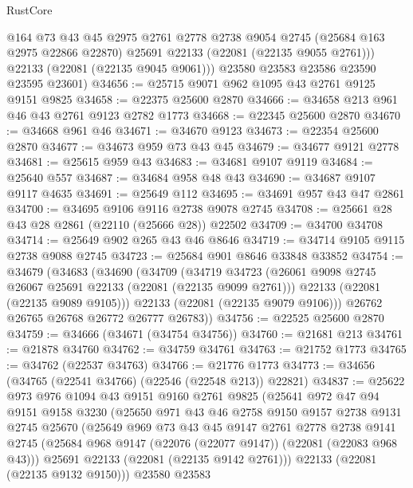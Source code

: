 \begin{lexlean}{RustCore}
\begin{coremodule}
          @164
          @73
          @43
          @45
          @2975
          @2761
          @2778
          @2738
          @9054
          @2745
          (@25684 @163 @2975 @22866 @22870)
          @25691
          @22133
          (@22081 (@22135 @9055 @2761)))
        @22133
        (@22081 (@22135 @9045 @9061)))
      @23580
      @23583
      @23586
      @23590
      @23595
      @23601)
@34656 := @25715 @9071 @962 @1095 @43 @2761 @9125 @9151 @9825
@34658 := @22375 @25600 @2870
@34666 := @34658 @213 @961 @46 @43 @2761 @9123 @2782 @1773
@34668 := @22345 @25600 @2870
@34670 := @34668 @961 @46
@34671 := @34670 @9123
@34673 := @22354 @25600 @2870
@34677 := @34673 @959 @73 @43 @45
@34679 := @34677 @9121 @2778
@34681 := @25615 @959 @43
@34683 := @34681 @9107 @9119
@34684 := @25640 @557
@34687 := @34684 @958 @48 @43
@34690 := @34687 @9107 @9117 @4635
@34691 := @25649 @112
@34695 := @34691 @957 @43 @47 @2861
@34700 := @34695 @9106 @9116 @2738 @9078 @2745
@34708 := @25661 @28 @43 @28 @2861 (@22110 (@25666 @28)) @22502
@34709 := @34700 @34708
@34714 := @25649 @902 @265 @43 @46 @8646
@34719 := @34714 @9105 @9115 @2738 @9088 @2745
@34723 := @25684 @901 @8646 @33848 @33852
@34754 := @34679
    (@34683
      (@34690
        (@34709
          (@34719
            @34723
            (@26061 @9098 @2745 @26067 @25691 @22133 (@22081 (@22135 @9099 @2761)))
            @22133
            (@22081 (@22135 @9089 @9105)))
          @22133
          (@22081 (@22135 @9079 @9106)))
        @26762
        @26765
        @26768
        @26772
        @26777
        @26783))
@34756 := @22525 @25600 @2870
@34759 := @34666 (@34671 (@34754 @34756))
@34760 := @21681 @213
@34761 := @21878 @34760
@34762 := @34759 @34761
@34763 := @21752 @1773
@34765 := @34762 (@22537 @34763)
@34766 := @21776 @1773
@34773 := @34656 (@34765 (@22541 @34766) (@22546 (@22548 @213)) @22821)
@34837 := @25622
    @973
    @976
    @1094
    @43
    @9151
    @9160
    @2761
    @9825
    (@25641
      @972
      @47
      @94
      @9151
      @9158
      @3230
      (@25650
        @971
        @43
        @46
        @2758
        @9150
        @9157
        @2738
        @9131
        @2745
        @25670
        (@25649
          @969
          @73
          @43
          @45
          @9147
          @2761
          @2778
          @2738
          @9141
          @2745
          (@25684 @968 @9147 (@22076 (@22077 @9147)) (@22081 (@22083 @968 @43)))
          @25691
          @22133
          (@22081 (@22135 @9142 @2761)))
        @22133
        (@22081 (@22135 @9132 @9150)))
      @23580
      @23583

\end{coremodule}
\end{lexlean}
